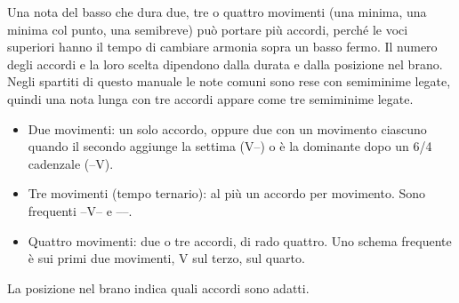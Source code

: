 Una nota del basso che dura due, tre o quattro movimenti (una minima, una minima col punto, una semibreve) può portare più accordi, perché le voci superiori hanno il tempo di cambiare armonia sopra un basso fermo. Il numero degli accordi e la loro scelta dipendono dalla durata e dalla posizione nel brano. Negli spartiti di questo manuale le note comuni sono rese con semiminime legate, quindi una nota lunga con tre accordi appare come tre semiminime legate.

\begin{regola}
	\label{reg:durata_accordi}
	\begin{itemize}
		\item Due movimenti: un solo accordo, oppure due con un movimento ciascuno quando il secondo aggiunge la settima (V--) o è la dominante dopo un 6/4 cadenzale (--V).
		\item Tre movimenti (tempo ternario): al più un accordo per movimento. Sono frequenti --V-- e ----.
		\item Quattro movimenti: due o tre accordi, di rado quattro. Uno schema frequente è  sui primi due movimenti, V sul terzo,  sul quarto.
	\end{itemize}
\end{regola}

La posizione nel brano indica quali accordi sono adatti.

